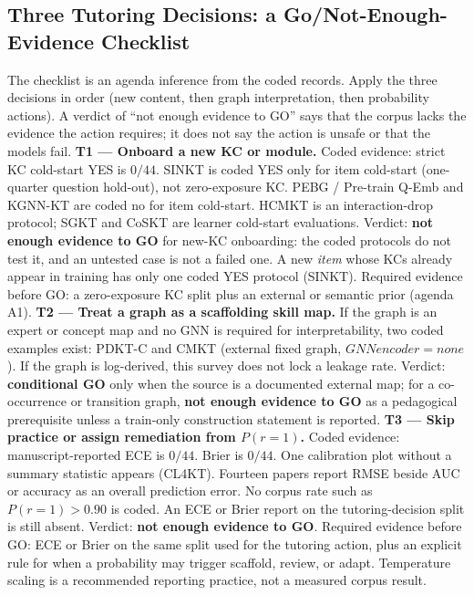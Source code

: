\documentclass[lettersize,journal]{IEEEtran}
\begin{document}
\subsection{Three Tutoring Decisions: a Go/Not-Enough-Evidence Checklist}
\label{sec:go_nogo}
The checklist is an agenda inference from the coded records. Apply the three decisions in order (new content, then graph interpretation, then probability actions). A verdict of ``not enough evidence to GO'' says that the corpus lacks the evidence the action requires; it does not say the action is unsafe or that the models fail.
\textbf{T1 --- Onboard a new KC or module.}
Coded evidence: strict KC cold-start YES is $0/44$. SINKT \cite{KT044_SINKT_2024} is coded YES only for item cold-start (one-quarter question hold-out), not zero-exposure KC. PEBG / Pre-train Q-Emb \cite{KT026_PretrainQ_2020} and KGNN-KT \cite{KT076_KGNNKT_2025} are coded no for item cold-start. HCMKT is an interaction-drop protocol; SGKT and CoSKT are learner cold-start evaluations.
Verdict: \textbf{not enough evidence to GO} for new-KC onboarding: the coded protocols do not test it, and an untested case is not a failed one. A new \emph{item} whose KCs already appear in training has only one coded YES protocol (SINKT). Required evidence before GO: a zero-exposure KC split plus an external or semantic prior (agenda A1).
\textbf{T2 --- Treat a graph as a scaffolding skill map.}
If the graph is an expert or concept map and no GNN is required for interpretability, two coded examples exist: PDKT-C \cite{KT014_PDKTC_2018} and CMKT \cite{KT037_CMKT_2022} (external fixed graph, $GNN encoder = none$). If the graph is log-derived, this survey does not lock a leakage rate.
Verdict: \textbf{conditional GO} only when the source is a documented external map; for a co-occurrence or transition graph, \textbf{not enough evidence to GO} as a pedagogical prerequisite unless a train-only construction statement is reported.
\textbf{T3 --- Skip practice or assign remediation from $P(r=1)$.}
Coded evidence: manuscript-reported ECE is $0/44$. Brier is $0/44$. One calibration plot without a summary statistic appears (CL4KT). Fourteen papers report RMSE beside AUC or accuracy as an overall prediction error. No corpus rate such as $P(r=1)>0.90$ is coded. An ECE or Brier report on the tutoring-decision split is still absent.
Verdict: \textbf{not enough evidence to GO}. Required evidence before GO: ECE or Brier on the same split used for the tutoring action, plus an explicit rule for when a probability may trigger scaffold, review, or adapt. Temperature scaling is a recommended reporting practice, not a measured corpus result.
\end{document}
